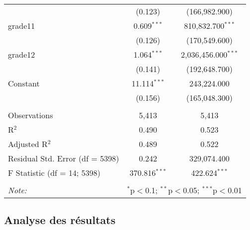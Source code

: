 \documentclass[
  11pt,
  french,
]{article}
\begin{document}
\begin{table}[!htbp]
\begin{tabular}{@{\extracolsep{1pt}}lcc}
  & (0.123) & (166,982.900) \\ 
  grade11 & 0.609$^{***}$ & 810,832.700$^{***}$ \\ 
  & (0.126) & (170,549.600) \\ 
  grade12 & 1.064$^{***}$ & 2,036,456.000$^{***}$ \\ 
  & (0.141) & (192,648.700) \\ 
  Constant & 11.114$^{***}$ & 243,224.000 \\ 
  & (0.156) & (165,048.300) \\ 
 \hline \\[-1.8ex] 
Observations & 5,413 & 5,413 \\ 
R$^{2}$ & 0.490 & 0.523 \\ 
Adjusted R$^{2}$ & 0.489 & 0.522 \\ 
Residual Std. Error (df = 5398) & 0.242 & 329,074.400 \\ 
F Statistic (df = 14; 5398) & 370.816$^{***}$ & 422.624$^{***}$ \\ 
\hline 
\hline \\[-1.8ex] 
\textit{Note:}  & \multicolumn{2}{r}{$^{*}$p$<$0.1; $^{**}$p$<$0.05; $^{***}$p$<$0.01} \\ 
\end{tabular} 
\end{table}

\newpage

\hypertarget{analyse-des-ruxe9sultats-3}{%
\subsection{Analyse des résultats}\label{analyse-des-ruxe9sultats-3}}

\begin{table}[!h]

\caption{\label{tab:unnamed-chunk-34}Comparaison des performances des régressions linéaires de l'analyse 3}
\centering
{}
\end{table}
\end{document}
